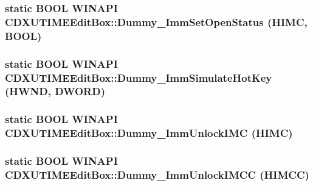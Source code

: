 \label{class_c_d_x_u_t_i_m_e_edit_box_a4fbcb1ed6d0f08f1a2149e86af71c8a6}
\hypertarget{class_c_d_x_u_t_i_m_e_edit_box_acf3e0acb26812bcf8285d81e3bd268c5}{
\subsubsection[{Dummy\_\-ImmSetOpenStatus}]{\setlength{\rightskip}{0pt plus 5cm}static {\bf BOOL} WINAPI CDXUTIMEEditBox::Dummy\_\-ImmSetOpenStatus ({\bf HIMC}, \/  {\bf BOOL})}}
\label{class_c_d_x_u_t_i_m_e_edit_box_acf3e0acb26812bcf8285d81e3bd268c5}
\hypertarget{class_c_d_x_u_t_i_m_e_edit_box_a91ad4dfb9e1f2e4194557a36989de3d6}{
\subsubsection[{Dummy\_\-ImmSimulateHotKey}]{\setlength{\rightskip}{0pt plus 5cm}static {\bf BOOL} WINAPI CDXUTIMEEditBox::Dummy\_\-ImmSimulateHotKey (HWND, \/  {\bf DWORD})}}
\label{class_c_d_x_u_t_i_m_e_edit_box_a91ad4dfb9e1f2e4194557a36989de3d6}
\hypertarget{class_c_d_x_u_t_i_m_e_edit_box_a84759711c77bb12d6dbf10ce089e36c9}{
\subsubsection[{Dummy\_\-ImmUnlockIMC}]{\setlength{\rightskip}{0pt plus 5cm}static {\bf BOOL} WINAPI CDXUTIMEEditBox::Dummy\_\-ImmUnlockIMC ({\bf HIMC})}}
\label{class_c_d_x_u_t_i_m_e_edit_box_a84759711c77bb12d6dbf10ce089e36c9}
\hypertarget{class_c_d_x_u_t_i_m_e_edit_box_a5795f61c3458a7f260e6af8a874cc509}{
\subsubsection[{Dummy\_\-ImmUnlockIMCC}]{\setlength{\rightskip}{0pt plus 5cm}static {\bf BOOL} WINAPI CDXUTIMEEditBox::Dummy\_\-ImmUnlockIMCC (HIMCC)}}
